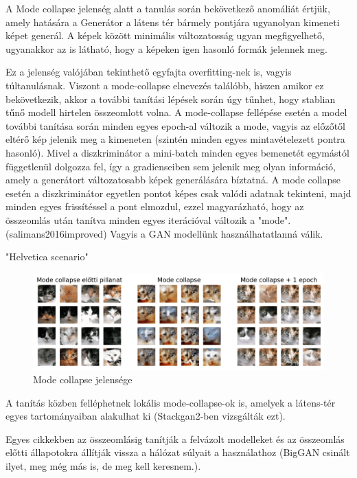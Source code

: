 
A Mode collapse jelenség alatt a tanulás során bekövetkező anomáliát értjük, amely hatására a Generátor a látens tér bármely pontjára ugyanolyan kimeneti képet generál. A képek között minimális változatosság ugyan megfigyelhető, ugyanakkor az is látható, hogy a képeken igen hasonló formák jelennek meg.

Ez a jelenség valójában tekinthető egyfajta overfitting-nek is, vagyis túltanulásnak. Viszont a mode-collapse elnevezés találóbb, hiszen amikor ez bekövetkezik, akkor a további tanítási lépések során úgy tűnhet, hogy stablian tűnő modell hirtelen összeomlott volna.
A mode-collapse fellépése esetén a model további tanítása során minden egyes epoch-al változik a mode, vagyis az előzőtől eltérő kép jelenik meg a kimeneten (szintén minden egyes mintavételezett pontra hasonló). Mivel a diszkriminátor a mini-batch minden egyes bemenetét egymástól függetlenül dolgozza fel, így a gradienseiben sem jelenik meg olyan információ, amely a generátort változatosabb képek generálására bíztatná. A mode collapse esetén a diszkriminátor egyetlen pontot képes csak valódi adatnak tekinteni, majd minden egyes frissítéssel a pont elmozdul, ezzel magyarázható, hogy az összeomlás után tanítva minden egyes iterációval változik a "mode".
(salimans2016improved)
Vagyis a GAN modellünk használhatatlanná válik.

"Helvetica scenario"

\begin{figure}[h]
\centering
\includegraphics[width=15cm]{images/mode-collapse.png}
\caption{Mode collapse jelensége}
\label{fig:mode-collapse}
\end{figure}

A tanítás közben felléphetnek lokális mode-collapse-ok is, amelyek a látens-tér egyes tartományaiban alakulhat ki (Stackgan2-ben vizsgálták ezt).

Egyes cikkekben az összeomlásig tanítják a felvázolt modelleket és az összeomlás előtti állapotokra állítják vissza a hálózat súlyait a használathoz (BigGAN csinált ilyet, meg még más is, de meg kell keresnem.).

